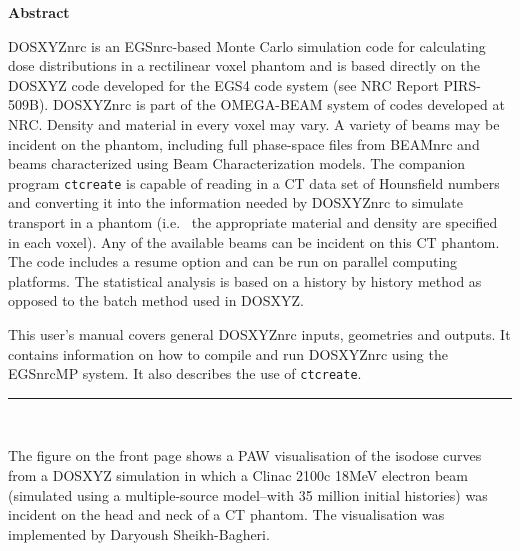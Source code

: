 \documentclass[12pt,twoside]{article}      %
\newcommand{\indexm}[1]{\index{#1}}
\begin{document}
\begin{center}
\begin{Large}
{\bf Abstract}
\end{Large}
\end{center}
\indexm{abstract}
DOSXYZnrc is an EGSnrc-based Monte Carlo simulation code for calculating
dose distributions in a rectilinear voxel phantom and is based directly
on the DOSXYZ code developed for the EGS4 code system (see NRC Report
PIRS-509B). DOSXYZnrc is part of the OMEGA-BEAM system of codes developed
at NRC.  Density and material in every voxel may vary.  A variety of beams
may be incident on the phantom, including full phase-space files from
BEAMnrc  and beams characterized using Beam Characterization models. The
companion program {\tt ctcreate} is capable of reading in a CT data set
of Hounsfield numbers and converting it into the information needed by
DOSXYZnrc to simulate transport in a phantom (i.e.  ~the appropriate
material and density are specified in each voxel).  Any of the available
beams can be incident on this CT phantom.  The code includes a resume
option and can be run on parallel computing platforms.  The statistical
analysis is based on a history by history method as opposed to the batch
method used in DOSXYZ.

This user's manual covers general DOSXYZnrc inputs, geometries and outputs.  It
contains information on how to compile and run DOSXYZnrc using the EGSnrcMP
system. It also describes
the use of {\tt ctcreate}.

\begin{latexonly}
\vspace{11.5cm}
\end{latexonly}

\rule{16.3cm}{0.6mm}\\
\begin{small}
The figure on the front page shows a PAW visualisation of the isodose
curves from a DOSXYZ simulation in which a Clinac 2100c 18MeV electron
beam (simulated using a multiple-source model--with 35 million initial
histories) was
incident on the head and neck of a CT phantom.  The visualisation was
implemented by Daryoush Sheikh-Bagheri.

\end{small}

\newpage

\indexm{contents}
\tableofcontents

\newpage

\end{document}
